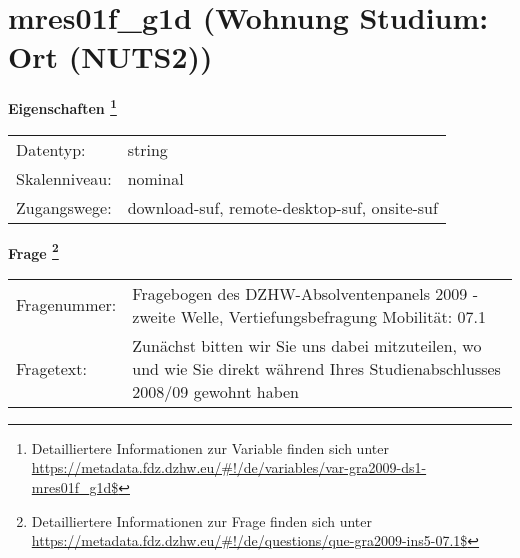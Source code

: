 
    \setcounter{footnote}{0}

    \vspace*{-1.8cm}
	\section{mres01f\_g1d (Wohnung Studium: Ort (NUTS2))}
	\label{section:mres01f_g1d}



    \vspace*{0.5cm}
    \noindent\textbf{Eigenschaften
	\footnote{Detailliertere Informationen zur Variable finden sich unter
		\url{https://metadata.fdz.dzhw.eu/\#!/de/variables/var-gra2009-ds1-mres01f_g1d$}}}\\
	\begin{tabularx}{\hsize}{@{}lX}
	Datentyp: & string \\
	Skalenniveau: & nominal \\
	Zugangswege: &
	  download-suf, 
	  remote-desktop-suf, 
	  onsite-suf
 \\
    \end{tabularx}



				\vspace*{0.5cm}
                \noindent\textbf{Frage
	                \footnote{Detailliertere Informationen zur Frage finden sich unter
		              \url{https://metadata.fdz.dzhw.eu/\#!/de/questions/que-gra2009-ins5-07.1$}}}\\
				\begin{tabularx}{\hsize}{@{}lX}
					Fragenummer: &
					  Fragebogen des DZHW-Absolventenpanels 2009 - zweite Welle, Vertiefungsbefragung Mobilität:
					  07.1
 \\
					Fragetext: & Zunächst bitten wir Sie uns dabei mitzuteilen, wo und wie Sie direkt während Ihres Studienabschlusses 2008/09 gewohnt haben \\
				\end{tabularx}





